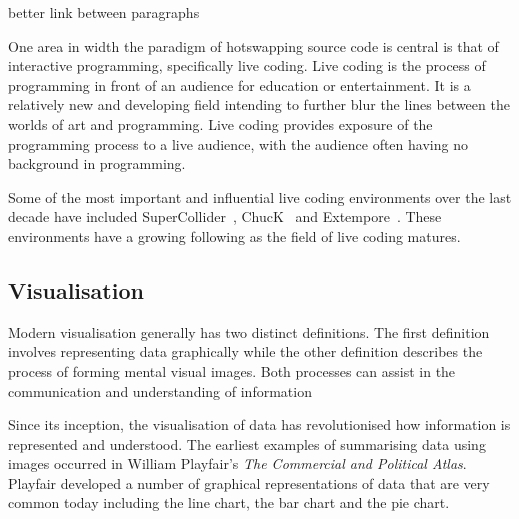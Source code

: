 {\color{red} better link between paragraphs}

One area in width the paradigm of hotswapping source code is central is that of interactive programming, specifically live coding. Live coding is the process of programming in front of an audience for education or entertainment. It is a relatively new and developing field intending to further blur the lines between the worlds of art and programming. Live coding provides exposure of the programming process to a live audience, with the audience often having no background in programming.

Some of the most important and influential live coding environments over the last decade have included SuperCollider~\cite{McCartney}, ChucK~\cite{Wang2008} and Extempore~\cite{Sorensen}. These environments have a growing following as the field of live coding matures.


\subsection{Visualisation}



Modern visualisation generally has two distinct definitions. The first definition involves representing data graphically while the other definition describes the process of forming mental visual images. {\color{red} Both processes can assist in the communication and understanding of information}

Since its inception, the visualisation of data has revolutionised how information is represented and understood. The earliest examples of summarising data using images occurred in William Playfair's \textit{The Commercial and Political Atlas}. Playfair developed a number of graphical representations of data that are very common today including the line chart, the bar chart and the pie chart.

